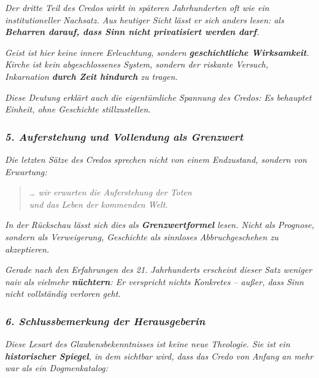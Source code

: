\documentclass[
]{article}
\begin{document}
\emph{Der dritte Teil des Credos wirkt in späteren Jahrhunderten oft wie ein institutioneller Nachsatz. Aus heutiger Sicht lässt er sich anders lesen: als \textbf{Beharren darauf, dass Sinn nicht privatisiert werden darf}.}

\emph{Geist ist hier keine innere Erleuchtung, sondern \textbf{geschichtliche Wirksamkeit}.\\
Kirche ist kein abgeschlossenes System, sondern der riskante Versuch, Inkarnation \textbf{durch Zeit hindurch} zu tragen.}

\emph{Diese Deutung erklärt auch die eigentümliche Spannung des Credos: Es behauptet Einheit, ohne Geschichte stillzustellen.}

\subsubsection{\texorpdfstring{\emph{\textbf{5. Auferstehung und Vollendung als Grenzwert}}}{5. Auferstehung und Vollendung als Grenzwert}}\label{auferstehung-und-vollendung-als-grenzwert}

\emph{Die letzten Sätze des Credos sprechen nicht von einem Endzustand, sondern von Erwartung:}

\begin{quote}
\emph{\ldots{} wir erwarten die Auferstehung der Toten\\
und das Leben der kommenden Welt.}
\end{quote}

\emph{In der Rückschau lässt sich dies als \textbf{Grenzwertformel} lesen. Nicht als Prognose, sondern als Verweigerung, Geschichte als sinnloses Abbruchgeschehen zu akzeptieren.}

\emph{Gerade nach den Erfahrungen des 21. Jahrhunderts erscheint dieser Satz weniger naiv als vielmehr \textbf{nüchtern}: Er verspricht nichts Konkretes -- außer, dass Sinn nicht vollständig verloren geht.}

\subsubsection{\texorpdfstring{\emph{\textbf{6. Schlussbemerkung der Herausgeberin}}}{6. Schlussbemerkung der Herausgeberin}}\label{schlussbemerkung-der-herausgeberin}

\emph{Diese Lesart des Glaubensbekenntnisses ist keine neue Theologie. Sie ist ein \textbf{historischer Spiegel}, in dem sichtbar wird, dass das Credo von Anfang an mehr war als ein Dogmenkatalog:}
\end{document}
